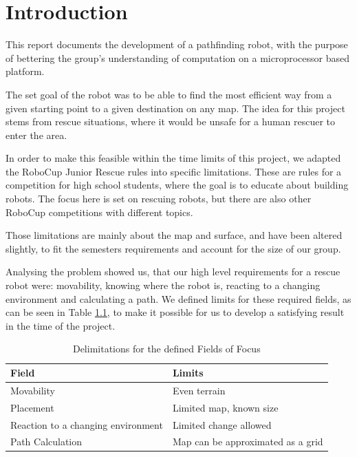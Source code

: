 \chapter{Introduction}\label{ch:introduction}

This report documents the development of a pathfinding robot,
with the purpose of bettering the group's understanding of computation on a microprocessor based platform.

The set goal of the robot was to be able to find the most efficient way
from a given starting point to a given destination on any map.
The idea for this project stems from rescue situations,
where it would be unsafe for a human rescuer to enter the area.

In order to make this feasible within the time limits of this project,
we adapted the RoboCup Junior Rescue rules \cite{Robocup} into specific limitations.
These are rules for a competition for high school students,
where the goal is to educate about building robots.
The focus here is set on rescuing robots,
but there are also other RoboCup competitions with different topics.

Those limitations are mainly about the map and surface,
and have been altered slightly,
to fit the semesters requirements and account for the size of our group.

Analysing the problem showed us,
that our high level requirements for a rescue robot were:
movability,
knowing where the robot is,
reacting to a changing environment and
calculating a path.
We defined limits for these required fields, as can be seen in Table \ref{tab:limits},
to make it possible for us to develop a satisfying result in the time of the project. 

\begin{table}[h]
\centering
\begin{tabular}{|l|l|}
	\hline%
	Field 				& Limits							\\
	\hline%
	Movability			& Even terrain						\\
	Placement			& Limited map, known size			\\
	Reaction to a changing environment	& Limited change allowed			\\
	Path Calculation	& Map can be approximated as a grid	\\
	\hline%
\end{tabular}
\caption{Delimitations for the defined Fields of Focus}
\label{tab:limits}
\end{table}


